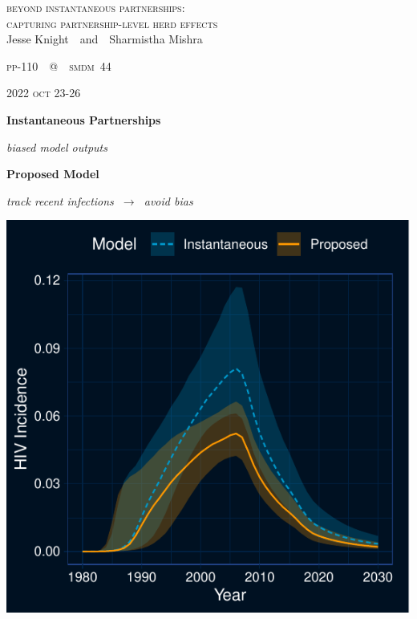 \documentclass[aspectratio=169]{beamer}
\begin{document}
  \begin{frame}\raggedleft
    \textsc{\Large
      beyond instantaneous partnerships:\\
      capturing partnership-level herd effects\\
      }
    \vfill
    Jesse Knight~~and~~Sharmistha Mishra
    \bigskip\par
    \textsc{pp-110~~{\footnotesize @}~~smdm~44}\par
    \textsc{2022 oct 23-26}
  \end{frame}
  \begin{frame}\vfill
    \begin{minipage}[t]{.5\linewidth}\centering
      \textbf{Instantaneous Partnerships}
      \bigskip\par
      
      \bigskip\par\pause
      \textit{biased model outputs}
    \end{minipage}\pause
    \begin{minipage}[t]{.5\linewidth}\centering
      \textbf{Proposed Model}
      \bigskip\par
      
      \bigskip\par\pause
      \textit{track recent infections $~\rightarrow~$ avoid bias}
    \end{minipage}
  \end{frame}
  \begin{frame}\centering
    \includegraphics[height=.8\textheight]{obj2a}
  \end{frame}
\end{document}
